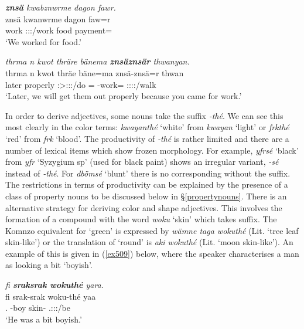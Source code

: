 \begin{exe}
	\ex \emph{\textbf{znsä} kwabznwrme dagon fawr.}\\
	\gll znsä kwanwrme dagon faw=r\\
	work \Fpl:\Sbj:\Pst:\Dur/work food payment=\Purp\\
	\trans `We worked for food.' 
	\label{ex503}
\end{exe}
\begin{exe}
	\ex \emph{thrma n kwot thräre bänema \textbf{znsäznsär} thwanyan.}\\
	\gll thrma n kwot thräe bäne=ma znsä-znsä=r thwan\\
	later \Imn{} properly \Fpl:\Sbj>\Stpl:\Obj:\Irr:\Pfv/do \Med=\Char{} \Redup-work=\Purp{} \Stdu:\Sbj:\Rpst:\Ipfv:\Venit/walk\\
	\trans `Later, we will get them out properly because you came for work.' 
	\label{ex504}
\end{exe}

In order to derive adjectives, some nouns take the  suffix \emph{-thé}. We can see this most clearly in the color terms: \emph{kwayanthé} `white' from \emph{kwayan} `light' or \emph{frkthé} `red' from \emph{frk} `blood'. The productivity of \emph{-thé} is rather limited and there are a number of lexical items which show frozen morphology. For example, \emph{yfrsé} `black' from \emph{yfr} `Syzygium sp' (used for black paint) shows an irregular variant, \emph{-sé} instead of \emph{-thé}. For \emph{dbömsé} `blunt' there is no corresponding  without the suffix. The restrictions in terms of productivity can be explained by the presence of a class of property nouns to be discussed below in \S{}\ref{propertynouns}. There is an alternative strategy for deriving color and shape adjectives. This involves the formation of a compound with the word \textit{woku} `skin' which takes  suffix. The Komnzo equivalent for  `green' is expressed by \emph{wämne taga wokuthé} (Lit. `tree leaf skin-like') or the translation of `round' is \emph{aki wokuthé} (Lit. `moon skin-like'). An example of this is given in (\ref{ex509}) below, where the speaker characterises a man as looking a bit `boyish'.

\begin{exe}
	\ex \emph{fi \textbf{sraksrak wokuthé} yara.}\\
	\gll fi srak-srak woku-thé yaa\\
	\Third.\Abs{} \Redup-boy skin-\Adlzr{} \Tsg.\Masc:\Sbj:\Pst:\Ipfv/be\\
	\trans `He was a bit boyish.' 
	\label{ex509}
\end{exe}

